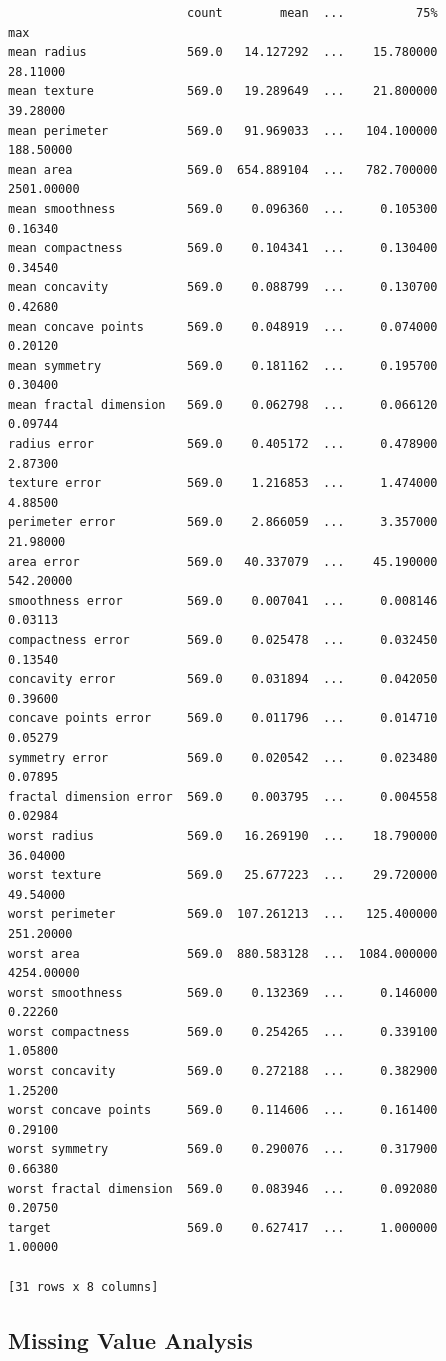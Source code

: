 \documentclass[12pt,a4paper]{article}
\begin{document}
\begin{verbatim}
                         count        mean  ...          75%         max
mean radius              569.0   14.127292  ...    15.780000    28.11000
mean texture             569.0   19.289649  ...    21.800000    39.28000
mean perimeter           569.0   91.969033  ...   104.100000   188.50000
mean area                569.0  654.889104  ...   782.700000  2501.00000
mean smoothness          569.0    0.096360  ...     0.105300     0.16340
mean compactness         569.0    0.104341  ...     0.130400     0.34540
mean concavity           569.0    0.088799  ...     0.130700     0.42680
mean concave points      569.0    0.048919  ...     0.074000     0.20120
mean symmetry            569.0    0.181162  ...     0.195700     0.30400
mean fractal dimension   569.0    0.062798  ...     0.066120     0.09744
radius error             569.0    0.405172  ...     0.478900     2.87300
texture error            569.0    1.216853  ...     1.474000     4.88500
perimeter error          569.0    2.866059  ...     3.357000    21.98000
area error               569.0   40.337079  ...    45.190000   542.20000
smoothness error         569.0    0.007041  ...     0.008146     0.03113
compactness error        569.0    0.025478  ...     0.032450     0.13540
concavity error          569.0    0.031894  ...     0.042050     0.39600
concave points error     569.0    0.011796  ...     0.014710     0.05279
symmetry error           569.0    0.020542  ...     0.023480     0.07895
fractal dimension error  569.0    0.003795  ...     0.004558     0.02984
worst radius             569.0   16.269190  ...    18.790000    36.04000
worst texture            569.0   25.677223  ...    29.720000    49.54000
worst perimeter          569.0  107.261213  ...   125.400000   251.20000
worst area               569.0  880.583128  ...  1084.000000  4254.00000
worst smoothness         569.0    0.132369  ...     0.146000     0.22260
worst compactness        569.0    0.254265  ...     0.339100     1.05800
worst concavity          569.0    0.272188  ...     0.382900     1.25200
worst concave points     569.0    0.114606  ...     0.161400     0.29100
worst symmetry           569.0    0.290076  ...     0.317900     0.66380
worst fractal dimension  569.0    0.083946  ...     0.092080     0.20750
target                   569.0    0.627417  ...     1.000000     1.00000

[31 rows x 8 columns]
\end{verbatim}

\subsection{Missing Value Analysis}
\label{sec:org4dc83b1}
\end{document}
